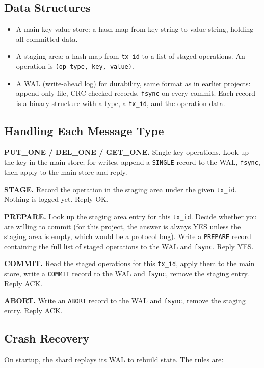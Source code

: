\documentclass[11pt,a4paper]{article}
\begin{document}
\subsection{Data Structures}
\begin{itemize}
\item A main key-value store: a hash map from key string to value string, holding all committed data.
\item A staging area: a hash map from \texttt{tx\_id} to a list of staged operations. An operation is \texttt{(op\_type, key, value)}.
\item A WAL (write-ahead log) for durability, same format as in earlier projects: append-only file, CRC-checked records, \texttt{fsync} on every commit. Each record is a binary structure with a type, a \texttt{tx\_id}, and the operation data.
\end{itemize}

\subsection{Handling Each Message Type}
\textbf{PUT\_ONE / DEL\_ONE / GET\_ONE.} Single-key operations. Look up the key in the main store; for writes, append a \texttt{SINGLE} record to the WAL, \texttt{fsync}, then apply to the main store and reply.

\textbf{STAGE.} Record the operation in the staging area under the given \texttt{tx\_id}. Nothing is logged yet. Reply OK.

\textbf{PREPARE.} Look up the staging area entry for this \texttt{tx\_id}. Decide whether you are willing to commit (for this project, the answer is always YES unless the staging area is empty, which would be a protocol bug). Write a \texttt{PREPARE} record containing the full list of staged operations to the WAL and \texttt{fsync}. Reply YES.

\textbf{COMMIT.} Read the staged operations for this \texttt{tx\_id}, apply them to the main store, write a \texttt{COMMIT} record to the WAL and \texttt{fsync}, remove the staging entry. Reply ACK.

\textbf{ABORT.} Write an \texttt{ABORT} record to the WAL and \texttt{fsync}, remove the staging entry. Reply ACK.

\subsection{Crash Recovery}
On startup, the shard replays its WAL to rebuild state. The rules are:
\end{document}
